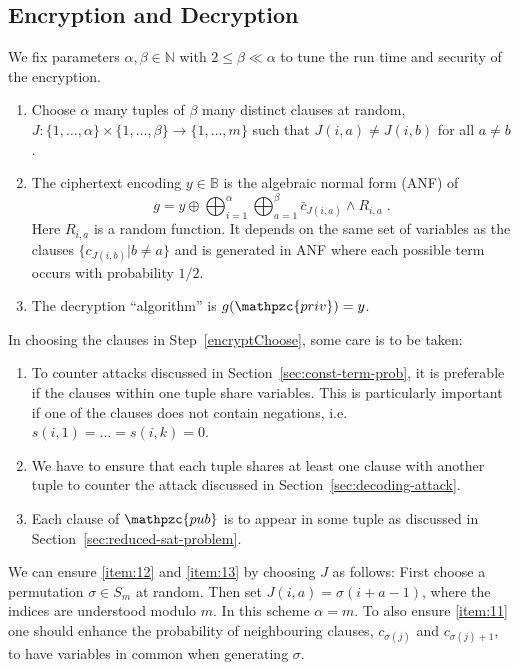 \documentclass[final,journal,compsoc]{IEEEtran}
\newcommand{\priv}{\mathpzc{priv}}
\newcommand{\pub}{\mathpzc{pub}}
\begin{document}
\subsection{Encryption and Decryption\label{sec:encAlg}}
We fix parameters $\alpha,\beta \in \mathbb N$ with $2\leq \beta \ll
\alpha$ to tune the run time and security of the encryption. 

\begin{enumerate}
\item \label{encryptChoose} Choose $\alpha$ many tuples of $\beta$
  many distinct clauses  at
  random,
$
J : \{1,\ldots,\alpha\}\times\{1,\ldots,\beta\}\to\{1,\ldots,m\} 
$
such that $J(i,a)\neq J(i,b)$ for all $a\neq b$.

\item \label{item:17} The ciphertext encoding $ y \in \mathbb B$
  is the algebraic normal form (ANF) of
\begin{equation}
\label{eq:encryption}
g= y \oplus \bigoplus_{i=1}^\alpha \bigoplus_{a=1}^\beta
\bar c_{J(i,a)} \wedge R_{i,a}\;.
\end{equation}
Here $R_{i,a}$ is a
random function. It depends on the same set of 
variables as the clauses $\{c_{J(i,b)} | b\neq a\}$ and is generated in ANF where each possible term occurs with probability $1/2$.

\item The decryption ``algorithm'' is $g(\priv)=y$.
\end{enumerate}
In choosing the clauses in Step~\ref{encryptChoose}, some care is
to be taken:
\begin{enumerate}[label=(\alph*)]
\item \label{item:11} To counter attacks discussed in Section~\ref{sec:const-term-prob}, it
  is preferable if the clauses within one tuple share variables. This
  is particularly important if one of the clauses does not contain
  negations, i.e.\ $s(i,1)=\ldots =s(i,k)=0$.
\item \label{item:12} We have to ensure that each tuple
  shares at least one clause with another tuple to counter the attack
  discussed in Section~\ref{sec:decoding-attack}.
\item \label{item:13} Each
  clause of $\pub$ is to appear in some tuple as discussed in
  Section~\ref{sec:reduced-sat-problem}.
\end{enumerate}


We can ensure \ref{item:12} and \ref{item:13} by choosing $J$ as follows:
First choose a permutation $\sigma \in S_m$ at random. Then set $J(i,a)=\sigma(i+a-1)$, where the
indices are understood modulo $m$. In this scheme $\alpha=m$. 
To also ensure \ref{item:11} one should enhance the probability of
neighbouring clauses, $c_{\sigma(j)}$ and  $c_{\sigma(j)+1}$, to have
variables in common when generating $\sigma$.
\end{document}
